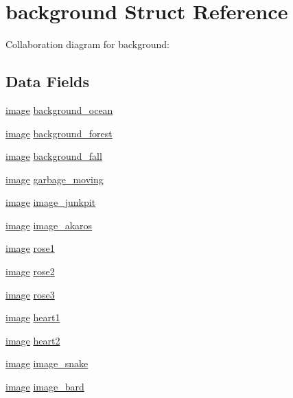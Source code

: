 \hypertarget{structbackground}{}\section{background Struct Reference}
\label{structbackground}


Collaboration diagram for background\+:
\subsection*{Data Fields}
\begin{DoxyCompactItemize}
\item 
\hyperlink{structimage}{image} \hyperlink{structbackground_a47fd1fcaef44e5021c69b3ce8bfe8991}{background\+\_\+ocean}
\item 
\hyperlink{structimage}{image} \hyperlink{structbackground_aef3613a5c64e350e70b79c00931f633a}{background\+\_\+forest}
\item 
\hyperlink{structimage}{image} \hyperlink{structbackground_ab89106431fbd165aa01da78d5d83a92a}{background\+\_\+fall}
\item 
\hyperlink{structimage}{image} \hyperlink{structbackground_aaa6665d16a643409414a64aad4a5f995}{garbage\+\_\+moving}
\item 
\hyperlink{structimage}{image} \hyperlink{structbackground_a678ac111a81c5d4ebe16322fb927df25}{image\+\_\+junkpit}
\item 
\hyperlink{structimage}{image} \hyperlink{structbackground_a4356ff725e07528178c0c5cef56aa994}{image\+\_\+akaros}
\item 
\hyperlink{structimage}{image} \hyperlink{structbackground_af52e15c3268d6e03ed266c3954699543}{rose1}
\item 
\hyperlink{structimage}{image} \hyperlink{structbackground_a186f299a17c0a9bd2af891ef132666ec}{rose2}
\item 
\hyperlink{structimage}{image} \hyperlink{structbackground_a320d1f4dbe5a5e2c976150c17c35f9f7}{rose3}
\item 
\hyperlink{structimage}{image} \hyperlink{structbackground_a3d77a42fb7810e756d93709aa71784bc}{heart1}
\item 
\hyperlink{structimage}{image} \hyperlink{structbackground_a6e78aa5d361b94d7c2c9eebacde96866}{heart2}
\item 
\hyperlink{structimage}{image} \hyperlink{structbackground_a3dd65cbed647fe7304e1215e0c79251b}{image\+\_\+snake}
\item 
\hyperlink{structimage}{image} \hyperlink{structbackground_a8cf47d9ec15e42bb0b165b6191e9dead}{image\+\_\+bard}

\end{DoxyCompactItemize}
